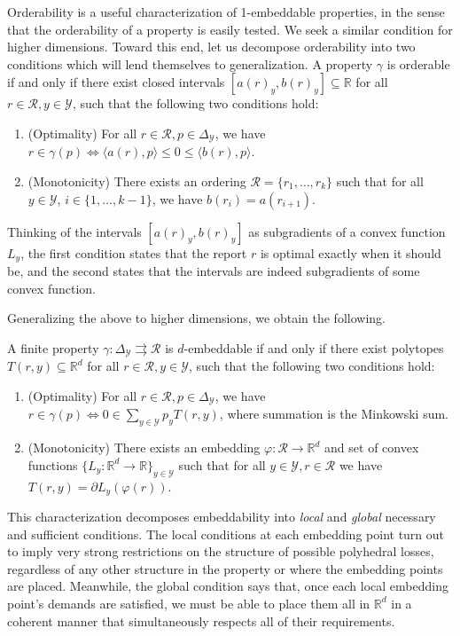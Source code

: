 \documentclass[anon,12pt]{colt2019}
\newcommand{\Comments}{1}
\newcommand{\mynote}[2]{\ifnum\Comments=1\textcolor{#1}{#2}\fi}
\newcommand{\raf}[1]{\mynote{green}{[RF: #1]}}
\newcommand{\bo}[1]{\mynote{blue}{[Bo: #1]}}
\newcommand{\reals}{\mathbb{R}}
\newcommand{\simplex}{\Delta_\Y}
\newcommand{\R}{\mathcal{R}}
\newcommand{\Y}{\mathcal{Y}}
\newcommand{\inprod}[2]{\langle #1, #2 \rangle}%
\newcommand{\toto}{\rightrightarrows}
\begin{document}
Orderability is a useful characterization of 1-embeddable properties, in the sense that the orderability of a property is easily tested.
We seek a similar condition for higher dimensions.
Toward this end, let us decompose orderability into two conditions which will lend themselves to generalization.
A property $\gamma$ is orderable if and only if there exist closed intervals $[a(r)_y,b(r)_y] \subseteq \reals$ for all $r\in\R, y\in\Y$, such that the following two conditions hold:
\begin{enumerate}
\item (Optimality) For all $r\in\R, p\in\simplex$, we have $r\in \gamma(p) \iff \inprod{a(r)}{p} \leq 0 \leq \inprod{b(r)}{p}$.
\item (Monotonicity) There exists an ordering $\R=\{r_1,\ldots,r_k\}$ such that for all $y\in\Y$, $i\in\{1,\ldots,k-1\}$, we have $b(r_i) = a(r_{i+1})$.
\end{enumerate}
Thinking of the intervals $[a(r)_y,b(r)_y]$ as subgradients of a convex function $L_y$, the first condition states that the report $r$ is optimal exactly when it should be, and the second states that the intervals are indeed subgradients of some convex function.

Generalizing the above to higher dimensions, we obtain the following.
\begin{theorem} \label{thm:char}
  A finite property $\gamma:\simplex\toto\R$ is $d$-embeddable if and only if there exist polytopes $T(r,y) \subseteq \reals^d$ for all $r\in\R, y\in\Y$, such that the following two conditions hold:
  \begin{enumerate}
  \item (Optimality) For all $r\in\R, p\in\simplex$, we have $r\in \gamma(p) \iff 0 \in \sum_{y\in\Y} p_y T(r,y)$, where summation is the Minkowski sum.
  \item (Monotonicity) There exists an embedding $\varphi: \R \to \reals^d$ and set of convex functions $\{L_y:\reals^d\to\reals\}_{y\in\Y}$ such that for all $y\in\Y, r\in\R$ we have $T(r,y) = \partial L_y(\varphi(r))$.
  \end{enumerate}
\end{theorem}

This characterization decomposes embeddability into \emph{local} and \emph{global} necessary and sufficient conditions.
The local conditions at each embedding point turn out to imply very strong restrictions on the structure of possible polyhedral losses, regardless of any other structure in the property or where the embedding points are placed.
Meanwhile, the global condition says that, once each local embedding point's demands are satisfied, we must be able to place them all in $\reals^d$ in a coherent manner that simultaneously respects all of their requirements.
\end{document}
